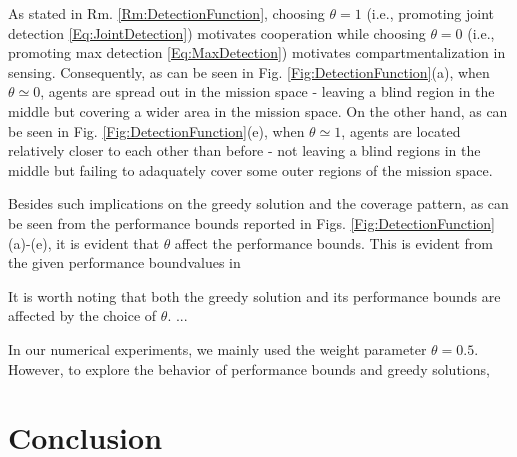 \documentclass[letterpaper, 10 pt, conference]{ieeeconf}
\begin{document}
As stated in Rm. \ref{Rm:DetectionFunction}, choosing $\theta=1$ (i.e., promoting joint detection \eqref{Eq:JointDetection}) motivates cooperation while choosing $\theta=0$ (i.e., promoting max detection \eqref{Eq:MaxDetection}) motivates compartmentalization in sensing. Consequently, as can be seen in Fig. \ref{Fig:DetectionFunction}(a), when $\theta \simeq 0$, agents are spread out in the mission space - leaving a blind region in the middle but covering a wider area in the mission space. On the other hand, as can be seen in Fig. \ref{Fig:DetectionFunction}(e), when $\theta \simeq 1$, agents are located relatively closer to each other than before - not leaving a blind regions in the middle but failing to adaquately cover some outer regions of the mission space. 


Besides such implications on the greedy solution and the coverage pattern, as can be seen from the performance bounds reported in Figs. \ref{Fig:DetectionFunction}(a)-(e), it is evident that $\theta$ affect the performance bounds. This is evident from the given performance boundvalues in        

It is worth noting that both the greedy solution and its performance bounds are affected by the choice of $\theta$. ...



In our numerical experiments, we mainly used the weight parameter $\theta=0.5$. However, to explore the behavior of performance bounds and greedy solutions,  








\section{Conclusion}
\label{Sec:Conclusion}




\end{document}
